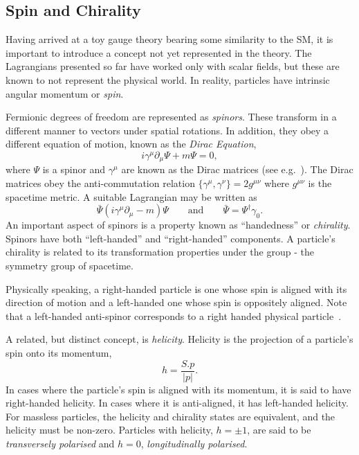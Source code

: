 \subsection{Spin and Chirality}
Having arrived at a toy gauge theory bearing some similarity to the \ac{SM}, it
is important to introduce a concept not yet represented in the theory. The
Lagrangians presented so far have worked only with scalar fields, but these are
known to not represent the physical world. In reality, particles have intrinsic
angular momentum or \emph{spin}.

Fermionic degrees of freedom are represented as \emph{spinors}. These transform
in a different manner to vectors under spatial rotations. In addition, they obey
a different equation of motion, known as the \emph{Dirac Equation},
\begin{equation*}
i\gamma^\mu \partial_{\mu}\Psi + m\Psi = 0,
\end{equation*}
where $\Psi$ is a spinor and $\gamma^{\mu}$ are known as the Dirac matrices (see
e.g.~\cite{aitchison}). The Dirac matrices obey the anti-commutation relation
$\{\gamma^{\mu}, \gamma^{\nu}\} = 2g^{\mu\nu}$ where $g^{\mu\nu}$ is the
spacetime metric. A suitable Lagrangian may be written as
\begin{equation*}
\bar{\Psi} \left (i\gamma^{\mu}\partial_{\mu} -m\right)\Psi \qquad \textrm{and} \qquad \bar{\Psi} =
\Psi^{\dagger}\gamma_0.
\end{equation*}
An important aspect of spinors is a property known as ``handedness'' or
\emph{chirality}. Spinors have both ``left-handed'' and ``right-handed''
components. A particle's chirality is related to its transformation properties
under the \poincare group - the symmetry group of spacetime.

Physically speaking, a right-handed particle is one whose spin
is aligned with its direction of motion and a left-handed one whose spin is
oppositely aligned. Note that a left-handed anti-spinor corresponds to a right
handed physical particle~\cite{peskin_schroeder}.

A related, but distinct concept, is \emph{helicity}. Helicity is the projection
of a particle's spin onto its momentum,
\begin{equation*}
h = \frac{S.p}{\left|p\right|}.
\end{equation*}
In cases where the particle's spin is aligned with its momentum, it is said to
have right-handed helicity. In cases where it is anti-aligned, it has
left-handed helicity. For massless particles, the helicity and chirality states
are equivalent, and the helicity must be non-zero. Particles with helicity,
$h=\pm 1$, are said to be \emph{transversely polarised} and $h=0$,
\emph{longitudinally polarised}.

